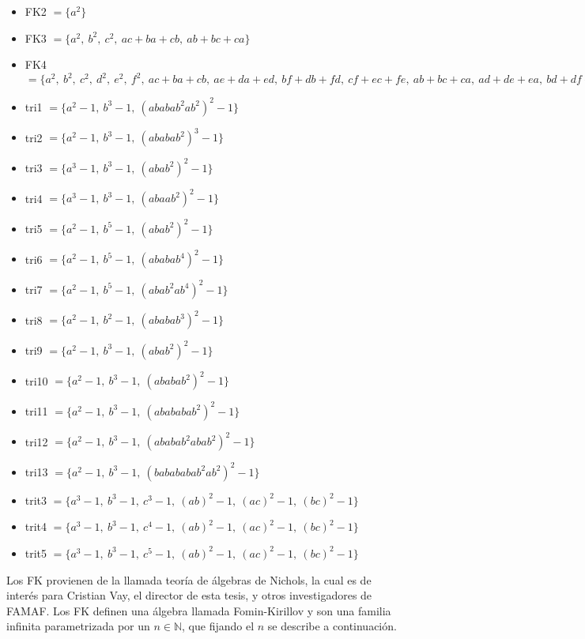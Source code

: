 \documentclass[12pt]{report}
\theoremstyle{customstyle}
\theoremstyle{factstyle}
\begin{document}
\begin{itemize}
  \item FK2 $ = \{a^2\}$
  \item FK3 $ = \{a^2,\ b^2,\ c^2,\ ac + ba + cb,\ ab + bc + ca\}$
  \item FK4 $ = \{a^2,\ b^2,\ c^2,\ d^2,\ e^2,\ f^2,\ ac + ba + cb,\ ae + da + ed,\ bf + db + fd,\ cf + ec + fe,\ ab + bc + ca,\ ad + de + ea,\ bd + df + fb,\ ce + ef + fc,\ cd + dc,\ be + eb,\ af + fa\}$
  \item tri1 $ = \{a^2 - 1,\ b^3 - 1,\ {(ababab^2ab^2)}^2 - 1\}$
  \item tri2 $ = \{a^2 - 1,\ b^3 - 1,\ {(ababab^2)}^3 - 1\}$
  \item tri3 $ = \{a^3 - 1,\ b^3 - 1,\ {(abab^2)}^2 - 1\}$
  \item tri4 $ = \{a^3 - 1,\ b^3 - 1,\ {(abaab^2)}^2 - 1\}$
  \item tri5 $ = \{a^2 - 1,\ b^5 - 1,\ {(abab^2)}^2 - 1\}$
  \item tri6 $ = \{a^2 - 1,\ b^5 - 1,\ {(ababab^4)}^2 - 1\}$
  \item tri7 $ = \{a^2 - 1,\ b^5 - 1,\ {(abab^2ab^4)}^2 - 1\}$
  \item tri8 $ = \{a^2 - 1,\ b^2 - 1,\ {(ababab^3)}^2 - 1\}$
  \item tri9 $ = \{a^2 - 1,\ b^3 - 1,\ {(abab^2)}^2 - 1\}$
  \item tri10 $ = \{a^2 - 1,\ b^3 - 1,\ {(ababab^2)}^2 - 1\}$
  \item tri11 $ = \{a^2 - 1,\ b^3 - 1,\ {(abababab^2)}^2 - 1\}$
  \item tri12 $ = \{a^2 - 1,\ b^3 - 1,\ {(ababab^2abab^2)}^2 - 1\}$
  \item tri13 $ = \{a^2 - 1,\ b^3 - 1,\ {(babababab^2ab^2)}^2 - 1\}$
  \item trit3 $ = \{a^3 - 1,\ b^3 - 1,\ c^3 - 1,\ {(ab)}^2 - 1,\ {(ac)}^2 - 1,\ {(bc)}^2 - 1\}$
  \item trit4 $ = \{a^3 - 1,\ b^3 - 1,\ c^4 - 1,\ {(ab)}^2 - 1,\ {(ac)}^2 - 1,\ {(bc)}^2 - 1\}$
  \item trit5 $ = \{a^3 - 1,\ b^3 - 1,\ c^5 - 1,\ {(ab)}^2 - 1,\ {(ac)}^2 - 1,\ {(bc)}^2 - 1\}$
\end{itemize}

Los FK provienen de la llamada teoría de álgebras de Nichols, la cual es de interés para Cristian Vay, el director de esta tesis, y otros investigadores de FAMAF. Los FK definen una álgebra llamada Fomin-Kirillov y son una familia infinita parametrizada por un $n ∈ ℕ$, que fijando el $n$ se describe a continuación.
\end{document}
